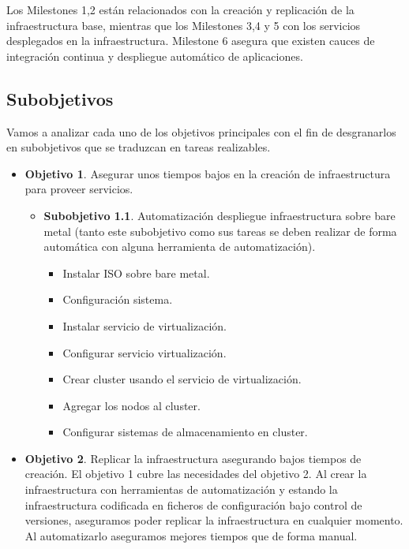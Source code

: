 \begin{text}
                Los Milestones 1,2 están relacionados con la creación y replicación de la infraestructura base, mientras que los Milestones 3,4 y 5 con los servicios desplegados en la infraestructura. Milestone 6 asegura que existen cauces de integración continua y despliegue automático de aplicaciones.

                \end{text}

        \subsection{Subobjetivos}
                \begin{text}
                        Vamos a analizar cada uno de los objetivos principales con el fin de desgranarlos en subobjetivos que se traduzcan en tareas realizables. 
                        \begin{itemize}
                                \item \textbf{Objetivo 1}. Asegurar unos tiempos bajos en la creación de infraestructura para proveer servicios.
                                \begin{itemize}
                                        \item \textbf{Subobjetivo 1.1}. Automatización despliegue infraestructura sobre bare metal (tanto este subobjetivo como sus tareas se deben realizar de forma automática con alguna herramienta de automatización).
                                        \begin{itemize}
                                                \item Instalar ISO sobre bare metal.
                                                \item Configuración sistema.
                                                \item Instalar servicio de virtualización.
                                                \item Configurar servicio virtualización.
                                                \item Crear cluster usando el servicio de virtualización.
                                                \item Agregar los nodos al cluster.
                                                \item Configurar sistemas de almacenamiento en cluster.
                                        \end{itemize}
                                \end{itemize}
                                \item \textbf{Objetivo 2}. Replicar la infraestructura asegurando bajos tiempos de creación. El objetivo 1 cubre las necesidades del objetivo 2. Al crear la infraestructura con herramientas de automatización y estando la infraestructura codificada en ficheros de configuración bajo control de versiones, aseguramos poder replicar la infraestructura en cualquier momento. Al automatizarlo aseguramos mejores tiempos que de forma manual.


\end{itemize}
\end{text}
